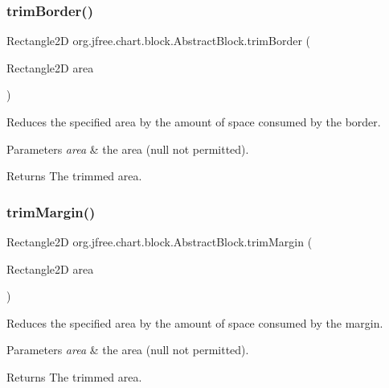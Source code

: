 \subsubsection{\texorpdfstring{trim\+Border()}{trimBorder()}}
{\footnotesize\ttfamily Rectangle2D org.\+jfree.\+chart.\+block.\+Abstract\+Block.\+trim\+Border (\begin{DoxyParamCaption}\item[{Rectangle2D}]{area }\end{DoxyParamCaption})\hspace{0.3cm}{\ttfamily [protected]}}

Reduces the specified area by the amount of space consumed by the border.


\begin{DoxyParams}{Parameters}
{\em area} & the area ({\ttfamily null} not permitted).\\
\hline
\end{DoxyParams}
\begin{DoxyReturn}{Returns}
The trimmed area. 
\end{DoxyReturn}
\mbox{\label{classorg_1_1jfree_1_1chart_1_1block_1_1_abstract_block_a7dc204d6976b3c5c41cbb0aa6bd537dd}} 
\subsubsection{\texorpdfstring{trim\+Margin()}{trimMargin()}}
{\footnotesize\ttfamily Rectangle2D org.\+jfree.\+chart.\+block.\+Abstract\+Block.\+trim\+Margin (\begin{DoxyParamCaption}\item[{Rectangle2D}]{area }\end{DoxyParamCaption})\hspace{0.3cm}{\ttfamily [protected]}}

Reduces the specified area by the amount of space consumed by the margin.


\begin{DoxyParams}{Parameters}
{\em area} & the area ({\ttfamily null} not permitted).\\
\hline
\end{DoxyParams}
\begin{DoxyReturn}{Returns}
The trimmed area. 
\end{DoxyReturn}
\mbox{\label{classorg_1_1jfree_1_1chart_1_1block_1_1_abstract_block_ac83feddec58b91ac25c4805faf7f3a10}} 
